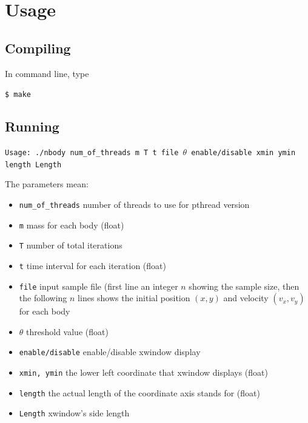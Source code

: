 \documentclass[11pt, a4paper]{article}
\begin{document}
\section{Usage}

\subsection{Compiling}

In command line, type

\texttt{\$ make}

\subsection{Running}

\texttt{Usage: ./nbody num\_of\_threads m T t file $\theta$ enable/disable xmin ymin length Length}

The parameters mean:

\begin{itemize}
    \item \texttt{num\_of\_threads} number of threads to use for pthread version
    \item \texttt{m} mass for each body (float)
    \item \texttt{T} number of total iterations
    \item \texttt{t} time interval for each iteration (float)
    \item \texttt{file} input sample file (first line an integer $n$ showing the sample size, then the following $n$ lines shows the initial position $(x, y)$ and velocity $(v_x, v_y)$ for each body
    \item \texttt{$\theta$} threshold value (float)
    \item \texttt{enable/disable} enable/disable xwindow display
    \item \texttt{xmin, ymin} the lower left coordinate that xwindow displays (float)
    \item \texttt{length} the actual length of the coordinate axis stands for (float)
    \item \texttt{Length} xwindow's side length
\end{itemize}
\end{document}
